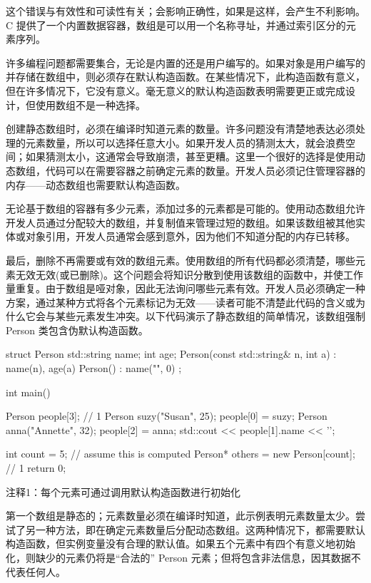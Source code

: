 这个错误与有效性和可读性有关；会影响正确性，如果是这样，会产生不利影响。C 提供了一个内置数据容器，数组是可以用一个名称寻址，并通过索引区分的元素序列。


许多编程问题都需要集合，无论是内置的还是用户编写的。如果对象是用户编写的并存储在数组中，则必须存在默认构造函数。在某些情况下，此构造函数有意义，但在许多情况下，它没有意义。毫无意义的默认构造函数表明需要更正或完成设计，但使用数组不是一种选择。

创建静态数组时，必须在编译时知道元素的数量。许多问题没有清楚地表达必须处理的元素数量，所以可以选择任意大小。如果开发人员的猜测太大，就会浪费空间；如果猜测太小，这通常会导致崩溃，甚至更糟。这里一个很好的选择是使用动态数组，代码可以在需要容器之前确定元素的数量。开发人员必须记住管理容器的内存——动态数组也需要默认构造函数。

无论基于数组的容器有多少元素，添加过多的元素都是可能的。使用动态数组允许开发人员通过分配较大的数组，并复制值来管理过短的数组。如果该数组被其他实体或对象引用，开发人员通常会感到意外，因为他们不知道分配的内存已转移。

最后，删除不再需要或有效的数组元素。使用数组的所有代码都必须清楚，哪些元素无效无效(或已删除)。这个问题会将知识分散到使用该数组的函数中，并使工作量重复。由于数组是哑对象，因此无法询问哪些元素有效。开发人员必须确定一种方案，通过某种方式将各个元素标记为无效——读者可能不清楚此代码的含义或为什么它会与某些元素发生冲突。以下代码演示了静态数组的简单情况，该数组强制 Person 类包含伪默认构造函数。


\begin{cpp}
struct Person {
  std::string name;
  int age;
  Person(const std::string& n, int a) : name(n), age(a) {}
  Person() : name("", 0) {}
};

int main() {
  Person people[3]; // 1
  Person suzy("Susan", 25);
  people[0] = suzy;
  Person anna("Annette", 32);
  people[2] = anna;
  std::cout << people[1].name << '\n';

  int count = 5; // assume this is computed
  Person* others = new Person[count]; // 1
  return 0;
}
\end{cpp}

{\footnotesize
注释1：每个元素可通过调用默认构造函数进行初始化
}


第一个数组是静态的；元素数量必须在编译时知道，此示例表明元素数量太少。尝试了另一种方法，即在确定元素数量后分配动态数组。这两种情况下，都需要默认构造函数，但实例变量没有合理的默认值。如果五个元素中有四个有意义地初始化，则缺少的元素仍将是“合法的” Person 元素；但将包含非法信息，因其数据不代表任何人。

